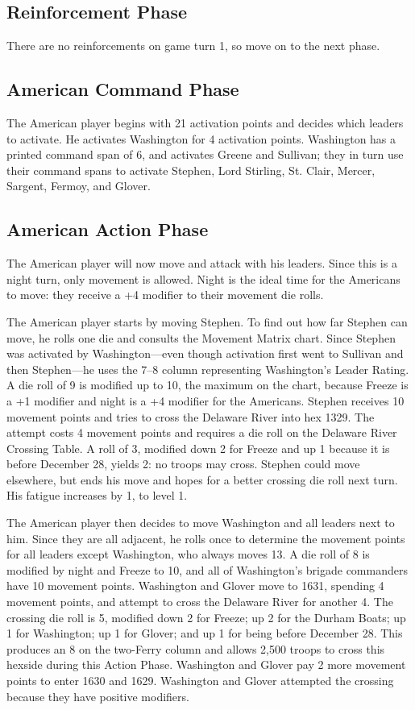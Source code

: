 \documentclass[11pt]{article}
\begin{document}
\subsection{Reinforcement Phase}

There are no reinforcements on game turn 1, so move on to the next phase.

\subsection{American Command Phase}

The American player begins with 21 activation points and decides which leaders to activate. He activates Washington for 4 activation points. Washington has a printed command span of 6, and activates Greene and Sullivan; they in turn use their command spans to activate Stephen, Lord Stirling, St. Clair, Mercer, Sargent, Fermoy, and Glover.

\subsection{American Action Phase}

The American player will now move and attack with his leaders. Since this is a night turn, only movement is allowed. Night is the ideal time for the Americans to move: they receive a +4 modifier to their movement die rolls.

The American player starts by moving Stephen. To find out how far Stephen can move, he rolls one die and consults the Movement Matrix chart. Since Stephen was activated by Washington---even though activation first went to Sullivan and then Stephen---he uses the 7--8 column representing Washington's Leader Rating. A die roll of 9 is modified up to 10, the maximum on the chart, because Freeze is a +1 modifier and night is a +4 modifier for the Americans. Stephen receives 10 movement points and tries to cross the Delaware River into hex 1329. The attempt costs 4 movement points and requires a die roll on the Delaware River Crossing Table. A roll of 3, modified down 2 for Freeze and up 1 because it is before December 28, yields 2: no troops may cross. Stephen could move elsewhere, but ends his move and hopes for a better crossing die roll next turn. His fatigue increases by 1, to level 1.

The American player then decides to move Washington and all leaders next to him. Since they are all adjacent, he rolls once to determine the movement points for all leaders except Washington, who always moves 13. A die roll of 8 is modified by night and Freeze to 10, and all of Washington's brigade commanders have 10 movement points. Washington and Glover move to 1631, spending 4 movement points, and attempt to cross the Delaware River for another 4. The crossing die roll is 5, modified down 2 for Freeze; up 2 for the Durham Boats; up 1 for Washington; up 1 for Glover; and up 1 for being before December 28. This produces an 8 on the two-Ferry column and allows 2,500 troops to cross this hexside during this Action Phase. Washington and Glover pay 2 more movement points to enter 1630 and 1629. Washington and Glover attempted the crossing because they have positive modifiers.
\end{document}
